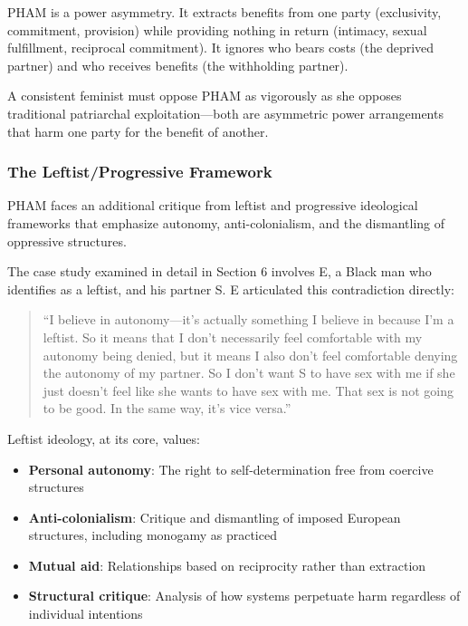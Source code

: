 \documentclass[12pt, letterpaper]{article}
\begin{document}
PHAM is a power asymmetry. It extracts benefits from one party (exclusivity, commitment, provision) while providing nothing in return (intimacy, sexual fulfillment, reciprocal commitment). It ignores who bears costs (the deprived partner) and who receives benefits (the withholding partner).

A consistent feminist must oppose PHAM as vigorously as she opposes traditional patriarchal exploitation---both are asymmetric power arrangements that harm one party for the benefit of another.

\subsubsection{The Leftist/Progressive Framework}

PHAM faces an additional critique from leftist and progressive ideological frameworks that emphasize autonomy, anti-colonialism, and the dismantling of oppressive structures.

The case study examined in detail in Section 6 involves E, a Black man who identifies as a leftist, and his partner S. E articulated this contradiction directly:

\begin{quote}
``I believe in autonomy---it's actually something I believe in because I'm a leftist. So it means that I don't necessarily feel comfortable with my autonomy being denied, but it means I also don't feel comfortable denying the autonomy of my partner. So I don't want S to have sex with me if she just doesn't feel like she wants to have sex with me. That sex is not going to be good. In the same way, it's vice versa.''
\end{quote}

Leftist ideology, at its core, values:

\begin{itemize}
    \item \textbf{Personal autonomy}: The right to self-determination free from coercive structures
    \item \textbf{Anti-colonialism}: Critique and dismantling of imposed European structures, including monogamy as practiced
    \item \textbf{Mutual aid}: Relationships based on reciprocity rather than extraction
    \item \textbf{Structural critique}: Analysis of how systems perpetuate harm regardless of individual intentions
\end{itemize}
\end{document}
